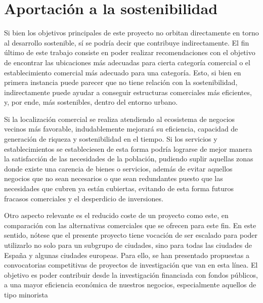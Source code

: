

\section{Aportación a la sostenibilidad}

Si bien los objetivos principales de este proyecto no orbitan directamente en torno al desarrollo sostenible, sí se podría decir que contribuye indirectamente. El fin último de este trabajo consiste en poder realizar recomendaciones con el objetivo de encontrar las ubicaciones más adecuadas para cierta categoría comercial o el establecimiento comercial más adecuado para una categoría. Esto, si bien en primera instancia puede parecer que no tiene relación con la sostenibilidad, indirectamente puede ayudar a conseguir estructuras comerciales más eficientes, y, por ende, más sostenibles, dentro del entorno urbano.

Si la localización comercial se realiza atendiendo al ecosistema de negocios vecinos más favorable, indudablemente mejorará su eficiencia, capacidad de generación de riqueza y sostenibilidad en el tiempo. Si los servicios y establecimientos se estableciesen de esta forma podría lograrse de mejor manera la satisfacción de las necesidades de la población, pudiendo suplir aquellas zonas donde existe una carencia de bienes o servicios, además de evitar aquellos negocios que no sean necesarios o que sean redundantes puesto que las necesidades que cubren ya están cubiertas, evitando de esta forma futuros fracasos comerciales y el desperdicio de inversiones.

Otro aspecto relevante es el reducido coste de un proyecto como este, en comparación con las alternativas comerciales que se ofrecen para este fin. En este sentido, nótese que el presente proyecto tiene vocación de ser escalado para poder utilizarlo no solo para un subgrupo de ciudades, sino para todas las ciudades de España y algunas ciudades europeas. Para ello, se han presentado propuestas a convocatorias competitivas de proyectos de investigación que van en esta línea. El objetivo es poder contribuir desde la investigación financiada con fondos públicos, a una mayor eficiencia económica de nuestros negocios, especialmente aquellos de tipo minorista
